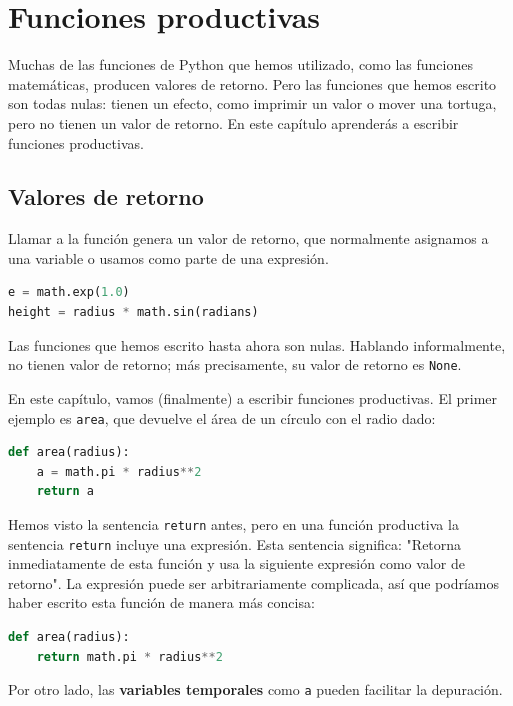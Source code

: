 \chapter{Funciones productivas}

Muchas de las funciones de Python que hemos utilizado, como las funciones matemáticas, producen valores de retorno. Pero las funciones que hemos escrito son todas nulas: tienen un efecto, como imprimir un valor o mover una tortuga, pero no tienen un valor de retorno. En este capítulo aprenderás a escribir funciones productivas.

\section{Valores de retorno}

Llamar a la función genera un valor de retorno, que normalmente asignamos a una variable o usamos como parte de una expresión.

\begin{lstlisting}[language=Python]
e = math.exp(1.0)
height = radius * math.sin(radians)
\end{lstlisting}

Las funciones que hemos escrito hasta ahora son nulas. Hablando informalmente, no tienen valor de retorno; más precisamente, su valor de retorno es \texttt{None}.

En este capítulo, vamos (finalmente) a escribir funciones productivas. El primer ejemplo es \texttt{area}, que devuelve el área de un círculo con el radio dado:

\begin{lstlisting}[language=Python]
def area(radius):
    a = math.pi * radius**2
    return a
\end{lstlisting}

Hemos visto la sentencia \texttt{return} antes, pero en una función productiva la sentencia \texttt{return} incluye una expresión. Esta sentencia significa: "Retorna inmediatamente de esta función y usa la siguiente expresión como valor de retorno". La expresión puede ser arbitrariamente complicada, así que podríamos haber escrito esta función de manera más concisa:

\begin{lstlisting}[language=Python]
def area(radius):
    return math.pi * radius**2
\end{lstlisting}

Por otro lado, las \textbf{variables temporales} como \texttt{a} pueden facilitar la depuración.


